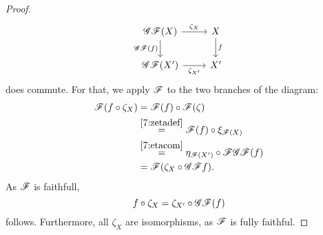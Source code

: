 \begin{proof}
\[
\begin{tikzcd}
\gfunc \ffunc (X)\ar{r}{\zeta_X}\ar[swap]{d}{\gfunc\ffunc(f)}&X\ar{d}{f}\\
\gfunc\ffunc(X')\ar[swap]{r}{\zeta_{X'}}&X'
\end{tikzcd}
\]
does commute. For that, we apply $\mathscr{F}$ to the two branches of the diagram:
\begin{align*}
    \mathscr{F}(f\circ \zeta_X) &= \mathscr{F}(f)\circ \mathscr{F}(\zeta) \\
    &\overset{\eqref{7:zetadef}}{=} \mathscr{F}(f)\circ \xi_{\mathscr{F}(X)}\\
    &\overset{\eqref{7:etacom}}{=} \eta_{\mathscr{F}(X')}\circ \mathscr{F} \mathscr{G} \mathscr{F}(f)\\
    &= \mathscr{F}(\zeta_X\circ \mathscr{G}\mathscr{F} f).
\end{align*}
As $\mathscr{F}$ is faithfull,
\[
f\circ \zeta_X = \zeta_{X'} \circ \mathscr{G}\mathscr{F}(f)
\]
follows. Furthermore, all $\zeta_X$ are isomorphisms, \coms as $\mathscr{F}$ is fully faithful.



\end{proof} 


